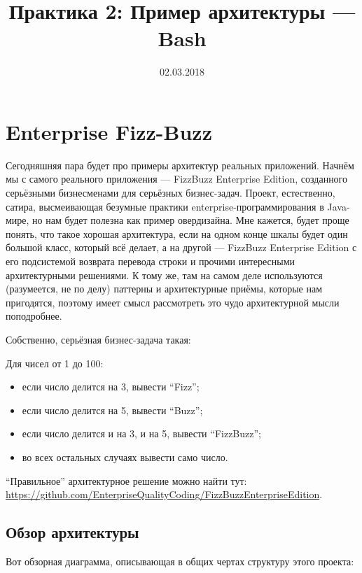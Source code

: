 \documentclass[a5paper]{article}
\title{Практика 2: Пример архитектуры --- Bash}
\date{02.03.2018}
\begin{document}
\maketitle
\thispagestyle{empty}

\section{Enterprise Fizz-Buzz}

Сегодняшняя пара будет про примеры архитектур реальных приложений. Начнём мы с самого реального приложения --- FizzBuzz Enterprise Edition, созданного серьёзными бизнесменами для серьёзных бизнес-задач. Проект, естественно, сатира, высмеивающая безумные практики enterprise-программирования в Java-мире, но нам будет полезна как пример овердизайна. Мне кажется, будет проще понять, что такое хорошая архитектура, если на одном конце шкалы будет один большой класс, который всё делает, а на другой --- FizzBuzz Enterprise Edition с его подсистемой возврата перевода строки и прочими интересными архитектурными решениями. К тому же, там на самом деле используются (разумеется, не по делу) паттерны и архитектурные приёмы, которые нам пригодятся, поэтому имеет смысл рассмотреть это чудо архитектурной мысли поподробнее.

Собственно, серьёзная бизнес-задача такая:

Для чисел от 1 до 100:
\begin{itemize}
	\item если число делится на 3, вывести ``Fizz'';
	\item если число делится на 5, вывести ``Buzz'';
	\item если число делится и на 3, и на 5, вывести ``FizzBuzz'';
	\item во всех остальных случаях вывести само число.
\end{itemize}

``Правильное'' архитектурное решение можно найти тут: \url{https://github.com/EnterpriseQualityCoding/FizzBuzzEnterpriseEdition}.

\subsection{Обзор архитектуры}

Вот обзорная диаграмма, описывающая в общих чертах структуру этого проекта:
\end{document}
